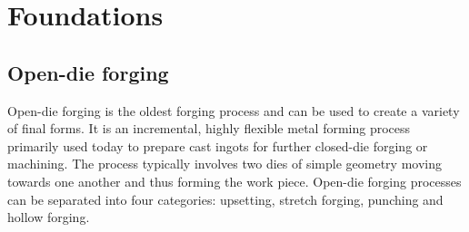 \section{Foundations}

\subsection{Open-die forging}
Open-die forging is the oldest forging process and can be used to create a variety of final forms. It is an incremental, highly flexible metal forming process primarily used today to prepare cast ingots for further closed-die forging or machining. The process typically involves two dies of simple geometry moving towards one another and thus forming the work piece. Open-die forging processes can be separated into four categories: upsetting, stretch forging, punching and hollow forging. 

